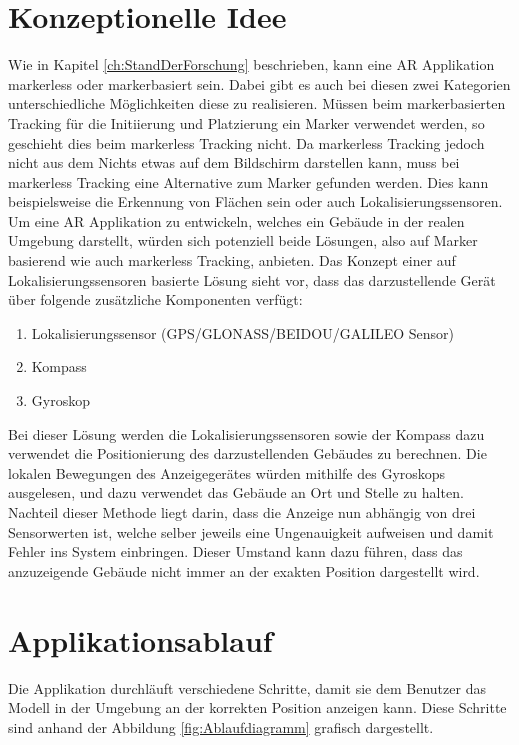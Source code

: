 \documentclass[a4paper]{scrreprt}
\begin{document}
\section{Konzeptionelle Idee}
\label{ch:KonzeptionelleIdee}
Wie in Kapitel \ref{ch:StandDerForschung} beschrieben, kann eine AR Applikation markerless oder markerbasiert sein. Dabei gibt es auch bei diesen zwei Kategorien unterschiedliche Möglichkeiten diese zu realisieren. Müssen beim markerbasierten Tracking für die Initiierung und Platzierung ein Marker verwendet werden, so geschieht dies beim markerless Tracking nicht. Da markerless Tracking jedoch nicht aus dem Nichts etwas auf dem Bildschirm darstellen kann, muss bei markerless Tracking eine Alternative zum Marker gefunden werden. Dies kann beispielsweise die Erkennung von Flächen sein \parencite{GoogleARCore2018} oder auch Lokalisierungssensoren.
Um eine AR Applikation zu entwickeln, welches ein Gebäude in der realen Umgebung darstellt, würden sich potenziell beide Lösungen, also auf Marker basierend wie auch markerless Tracking, anbieten.
\bigbreak
Das Konzept einer auf Lokalisierungssensoren basierte Lösung sieht vor, dass das darzustellende Gerät über folgende zusätzliche Komponenten verfügt:
\begin{enumerate}
	\item Lokalisierungssensor (GPS/GLONASS/BEIDOU/GALILEO Sensor)
	\item Kompass
	\item Gyroskop
\end{enumerate}

Bei dieser Lösung werden die Lokalisierungssensoren sowie der Kompass dazu verwendet die Positionierung des darzustellenden Gebäudes zu berechnen. Die lokalen Bewegungen des Anzeigegerätes würden mithilfe des Gyroskops ausgelesen, und dazu verwendet das Gebäude an Ort und Stelle zu halten.
Nachteil dieser Methode liegt darin, dass die Anzeige nun abhängig von drei Sensorwerten ist, welche selber jeweils eine Ungenauigkeit aufweisen und damit Fehler ins System einbringen. Dieser Umstand kann dazu führen, dass das anzuzeigende Gebäude nicht immer an der exakten Position dargestellt wird.

\section{Applikationsablauf}
Die Applikation durchläuft verschiedene Schritte, damit sie dem Benutzer das Modell in der Umgebung an der korrekten Position anzeigen kann. Diese Schritte sind anhand der Abbildung  \ref{fig:Ablaufdiagramm} grafisch dargestellt.
\end{document}
